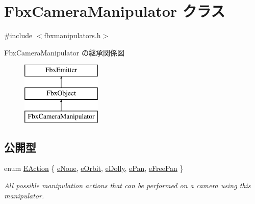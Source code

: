 \hypertarget{class_fbx_camera_manipulator}{}\section{Fbx\+Camera\+Manipulator クラス}
\label{class_fbx_camera_manipulator}


{\ttfamily \#include $<$fbxmanipulators.\+h$>$}

Fbx\+Camera\+Manipulator の継承関係図\begin{figure}[H]
\begin{center}
\leavevmode
\includegraphics[height=3.000000cm]{class_fbx_camera_manipulator}
\end{center}
\end{figure}
\subsection*{公開型}
\begin{DoxyCompactItemize}
\item 
enum \hyperlink{class_fbx_camera_manipulator_ada0f93888edb4a1c0140e35f99eba922}{E\+Action} \{ \newline
\hyperlink{class_fbx_camera_manipulator_ada0f93888edb4a1c0140e35f99eba922ad7f82cf29963964f19482d8f6e246efe}{e\+None}, 
\hyperlink{class_fbx_camera_manipulator_ada0f93888edb4a1c0140e35f99eba922a172298ef345544e9aa221599bf5fde25}{e\+Orbit}, 
\hyperlink{class_fbx_camera_manipulator_ada0f93888edb4a1c0140e35f99eba922a0aa0fccd579ee7ee47658bca13803471}{e\+Dolly}, 
\hyperlink{class_fbx_camera_manipulator_ada0f93888edb4a1c0140e35f99eba922a14e17787f7b2c85171219544e4f35045}{e\+Pan}, 
\newline
\hyperlink{class_fbx_camera_manipulator_ada0f93888edb4a1c0140e35f99eba922a870b225912367c395c73fb1aae971ec5}{e\+Free\+Pan}
 \}\begin{DoxyCompactList}\small\item\em All possible manipulation actions that can be performed on a camera using this manipulator. \end{DoxyCompactList}
\end{DoxyCompactItemize}
